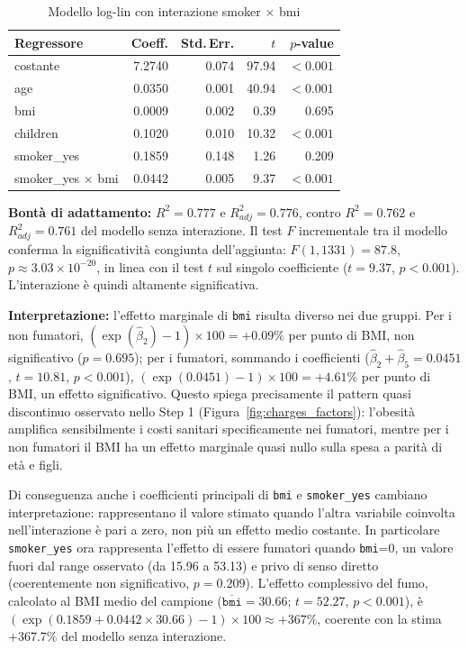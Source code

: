 \documentclass[11pt,a4paper]{article}
\begin{document}
\begin{table}[H]
\centering
\caption{Modello log-lin con interazione smoker $\times$ bmi}
\label{tab:interazione}
\begin{tabular}{lrrrr}
\toprule
Regressore & Coeff. & Std.\,Err. & $t$ & $p$-value \\
\midrule
costante                        & 7.2740  & 0.074  & 97.94  & $<0.001$ \\
age                             & 0.0350  & 0.001  & 40.94  & $<0.001$ \\
bmi                             & 0.0009  & 0.002  & 0.39   & 0.695 \\
children                        & 0.1020  & 0.010  & 10.32  & $<0.001$ \\
smoker\_yes                     & 0.1859  & 0.148  & 1.26   & 0.209 \\
smoker\_yes $\times$ bmi        & 0.0442  & 0.005  & 9.37   & $<0.001$ \\
\bottomrule
\end{tabular}
\end{table}

\textbf{Bontà di adattamento:} $R^2=0.777$ e $R^2_{adj}=0.776$, contro
$R^2=0.762$ e $R^2_{adj}=0.761$ del modello senza interazione. Il test $F$ incrementale tra il modello conferma la significatività
congiunta dell'aggiunta: $F(1,1331)=87.8$, $p\approx3.03\times10^{-20}$, in
linea con il test $t$ sul singolo coefficiente ($t=9.37$, $p<0.001$).
L'interazione è quindi altamente significativa.

\textbf{Interpretazione:} l'effetto marginale di
\texttt{bmi} risulta diverso nei due gruppi. Per i non
fumatori, $(\exp(\hat\beta_2)-1)\times100 = +0.09\%$ per punto di BMI,
non significativo ($p=0.695$); per i fumatori, sommando i coefficienti
($\hat\beta_2+\hat\beta_5=0.0451$, $t=10.81$, $p<0.001$),
$(\exp(0.0451)-1)\times100 = +4.61\%$ per punto di BMI, un effetto significativo. Questo spiega precisamente il pattern
quasi discontinuo osservato nello Step 1 (Figura~\ref{fig:charges_factors}):
l'obesità amplifica sensibilmente i costi sanitari specificamente nei
fumatori, mentre per i non fumatori il BMI ha un effetto marginale quasi
nullo sulla spesa a parità di età e figli.

Di conseguenza anche i coefficienti principali di \texttt{bmi} e
\texttt{smoker\_yes} cambiano interpretazione: rappresentano il valore
stimato quando l'altra variabile coinvolta nell'interazione è pari a
zero, non più un effetto medio costante. In particolare
\texttt{smoker\_yes} ora rappresenta l'effetto di essere fumatori quando
\texttt{bmi}=0, un valore fuori dal range osservato (da 15.96 a 53.13) e
privo di senso diretto (coerentemente non significativo, $p=0.209$).
L'effetto complessivo del fumo, calcolato al BMI medio del campione
($\overline{\texttt{bmi}}=30.66$; $t=52.27$, $p<0.001$), è
$(\exp(0.1859+0.0442\times30.66)-1)\times100 \approx +367\%$, coerente
con la stima $+367.7\%$ del modello senza interazione.
\end{document}
